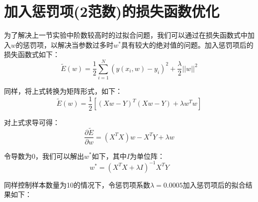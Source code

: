 \documentclass[12pt]{article}
\begin{document}
\section{加入惩罚项(2范数)的损失函数优化}
为了解决上一节实验中阶数较高时的过拟合问题，我们可以通过在损失函数式中加入$w$的惩罚项，以解决当参数过多时$w^*$具有较大的绝对值的问题。加入惩罚项后的损失函数式如下：
\[\tilde E(w)=\frac{1}{2}\sum_{i=1}^{N}({y(x_i,w)-y_i})^2+\frac{\lambda}{2}{||w||}^2\]\par
同样，将上式转换为矩阵形式，如下：
\[\tilde E(w)=\frac{1}{2}[(Xw-Y)^T(Xw-Y)+\lambda w^Tw]\]\par
对上式求导可得：
\[\frac{\partial\tilde{E}}{\partial w}=(X^TX)w-X^TY+\lambda w\]\par
令导数为0，我们可以解出$w^*$如下，其中$I$为单位阵：
\[w^*=(X^TX+\lambda I)^{-1}X^TY\]\par
同样控制样本数量为10的情况下，令惩罚项系数$\lambda = 0.0005$加入惩罚项后的拟合结果如下：
\begin{figure}[H]
    \centering
\end{figure}
\end{document}
